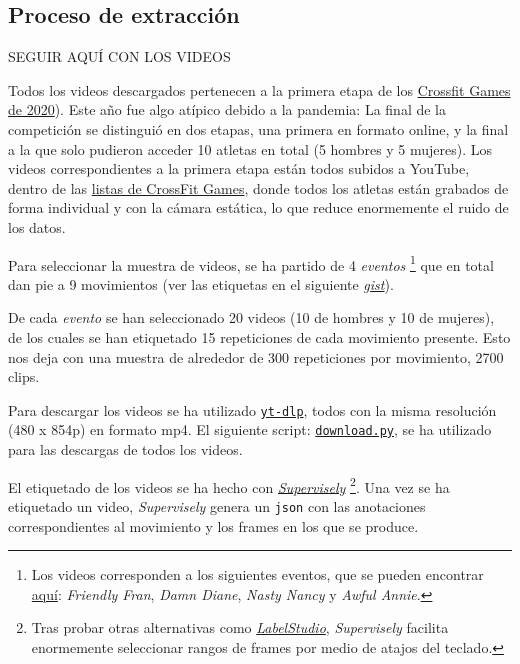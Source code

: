 \subsection{Proceso de extracción}

SEGUIR AQUÍ CON LOS VIDEOS

Todos los videos descargados pertenecen a la primera etapa de los \href{https://en.wikipedia.org/wiki/2020_CrossFit_Games}{Crossfit Games de 2020}). Este año fue algo atípico debido a la pandemia: La final de la competición se distinguió en dos etapas, una primera en formato online, y la final a la que solo pudieron acceder 10 atletas en total (5 hombres y 5 mujeres). Los videos correspondientes a la primera etapa están todos subidos a YouTube, dentro de las \href{https://www.youtube.com/c/CrossFitGamesTV/playlists}{listas de CrossFit Games}, donde todos los atletas están grabados de forma individual y con la cámara estática, lo que reduce enormemente el ruido de los datos.

Para seleccionar la muestra de videos, se ha partido de 4 \textit{eventos} \footnote{Los videos corresponden a los siguientes eventos, que se pueden encontrar \href{https://games.crossfit.com/workouts/games/2020}{aquí}: \textit{Friendly Fran}, \textit{Damn Diane}, \textit{Nasty Nancy} y \textit{Awful Annie}.} que en total dan pie a 9 movimientos (ver las etiquetas en el siguiente \href{https://gist.github.com/plaguss/58091caefee6acb39ae51cbc241b3cf9/raw/labels.txt}{\textit{gist}}).

De cada \textit{evento} se han seleccionado 20 videos (10 de hombres y 10 de mujeres), de los cuales se han etiquetado 15 repeticiones de cada movimiento presente. Esto nos deja con una muestra de alrededor de 300 repeticiones por movimiento, 2700 clips.

Para descargar los videos se ha utilizado \href{https://github.com/yt-dlp/yt-dlp}{\texttt{yt-dlp}}, todos con la misma resolución (480 x 854p) en formato mp4. El siguiente script: \href{https://github.com/plaguss/tfm-misc/blob/main/scripts/download.py}{\texttt{download.py}}, se ha utilizado para las descargas de todos los videos.

El etiquetado de los videos se ha hecho con \href{https://supervise.ly/}{\textit{Supervisely}} \footnote{Tras probar otras alternativas como \href{https://labelstud.io/}{\textit{LabelStudio}}, \textit{Supervisely} facilita enormemente seleccionar rangos de frames por medio de atajos del teclado.}.
Una vez se ha etiquetado un video, \textit{Supervisely} genera un \texttt{json} con las anotaciones correspondientes al movimiento y los frames en los que se produce.

